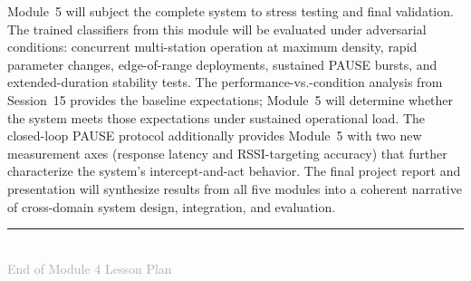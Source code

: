 \documentclass[11pt,letterpaper]{article}
\begin{document}
	Module~5 will subject the complete system to stress testing and final validation. The trained classifiers from this module will be evaluated under adversarial conditions: concurrent multi-station operation at maximum density, rapid parameter changes, edge-of-range deployments, sustained PAUSE bursts, and extended-duration stability tests. The performance-vs.-condition analysis from Session~15 provides the baseline expectations; Module~5 will determine whether the system meets those expectations under sustained operational load. The closed-loop PAUSE protocol additionally provides Module~5 with two new measurement axes (response latency and RSSI-targeting accuracy) that further characterize the system's intercept-and-act behavior. The final project report and presentation will synthesize results from all five modules into a coherent narrative of cross-domain system design, integration, and evaluation.

	\vfill
	\clearpage
	\printnoidxglossary[type=\acronymtype,title={Glossary}]

	\begin{center}
		\rule{0.5\textwidth}{0.4pt}\\[6pt]
		{\small\textcolor{darkgray}{End of Module 4 Lesson Plan}}
	\end{center}
\end{document}
